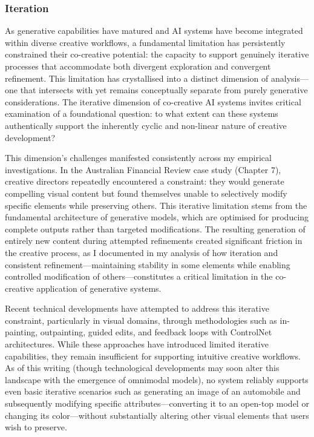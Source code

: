 \subsubsection{Iteration}

As generative capabilities have matured and AI systems have become integrated within diverse creative workflows, a fundamental limitation has persistently constrained their co-creative potential: the capacity to support genuinely iterative processes that accommodate both divergent exploration and convergent refinement. This limitation has crystallised into a distinct dimension of analysis—one that intersects with yet remains conceptually separate from purely generative considerations. The iterative dimension of co-creative AI systems invites critical examination of a foundational question: to what extent can these systems authentically support the inherently cyclic and non-linear nature of creative development?

This dimension's challenges manifested consistently across my empirical investigations. In the Australian Financial Review case study (Chapter 7), creative directors repeatedly encountered a constraint: they would generate compelling visual content but found themselves unable to selectively modify specific elements while preserving others. This iterative limitation stems from the fundamental architecture of generative models, which are optimised for producing complete outputs rather than targeted modifications. The resulting generation of entirely new content during attempted refinements created significant friction in the creative process, as I documented in my analysis of how iteration and consistent refinement—maintaining stability in some elements while enabling controlled modification of others—constitutes a critical limitation in the co-creative application of generative systems.

Recent technical developments have attempted to address this iterative constraint, particularly in visual domains, through methodologies such as in-painting, outpainting, guided edits, and feedback loops with ControlNet architectures. While these approaches have introduced limited iterative capabilities, they remain insufficient for supporting intuitive creative workflows. As of this writing (though technological developments may soon alter this landscape with the emergence of omnimodal models), no system reliably supports even basic iterative scenarios such as generating an image of an automobile and subsequently modifying specific attributes—converting it to an open-top model or changing its color—without substantially altering other visual elements that users wish to preserve.

